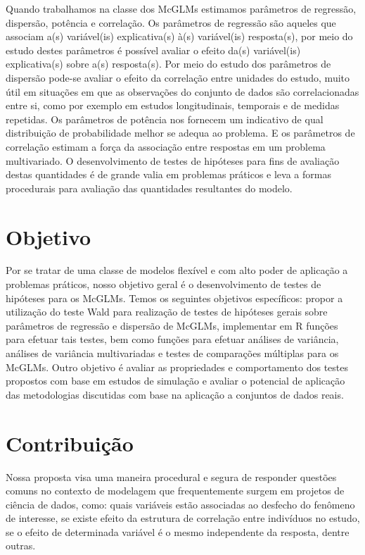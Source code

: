 Quando trabalhamos na classe dos McGLMs estimamos parâmetros de regressão, dispersão, potência e correlação. Os parâmetros de regressão são aqueles que associam a(s) variável(is) explicativa(s) à(s) variável(is) resposta(s), por meio do estudo destes parâmetros é possível avaliar o efeito da(s) variável(is) explicativa(s) sobre a(s) resposta(s). Por meio do estudo dos parâmetros de dispersão pode-se avaliar o efeito da correlação entre unidades do estudo, muito útil em situações em que as observações do conjunto de dados são correlacionadas entre si, como por exemplo em estudos longitudinais, temporais e de medidas repetidas. Os parâmetros de potência nos fornecem um indicativo de qual distribuição de probabilidade melhor se adequa ao problema. E os parâmetros de correlação estimam a força da associação entre respostas em um problema multivariado. O desenvolvimento de testes de hipóteses para fins de avaliação destas quantidades é de grande valia em problemas práticos e leva a formas procedurais para avaliação das quantidades resultantes do modelo.


\section{Objetivo}

Por se tratar de uma classe de modelos flexível e com alto poder de aplicação a problemas práticos, nosso objetivo geral é o desenvolvimento de testes de hipóteses para os McGLMs. Temos os seguintes objetivos específicos: propor a utilização do teste Wald para realização de testes de hipóteses gerais sobre parâmetros de regressão e dispersão de McGLMs, implementar em R funções para efetuar tais testes, bem como funções para efetuar análises de variância, análises de variância multivariadas e testes de comparações múltiplas para os McGLMs. Outro objetivo é avaliar as propriedades e comportamento dos testes propostos com base em estudos de simulação e avaliar o potencial de aplicação das metodologias discutidas com base na aplicação a conjuntos de dados reais.


\section{Contribuição}

Nossa proposta visa uma maneira procedural e segura de responder questões comuns no contexto de modelagem que frequentemente surgem em projetos de ciência de dados, como: quais variáveis estão associadas ao desfecho do fenômeno de interesse, se existe efeito da estrutura de correlação entre indivíduos no estudo, se o efeito de determinada variável é o mesmo independente da resposta, dentre outras.

